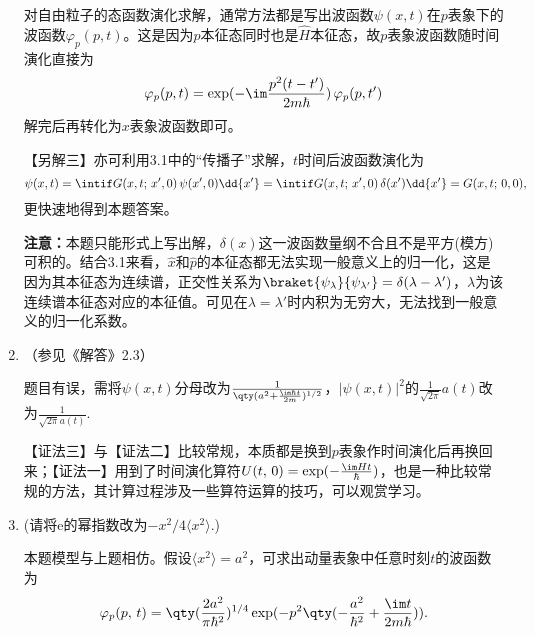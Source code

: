 \begin{enumerate}[label=\textbf{3.\arabic*}]


对自由粒子的态函数演化求解，通常方法都是写出波函数$\psi(x,t)$在$p$表象下的波函数$\varphi_p(p,t)$。这是因为$\hat{p}$本征态同时也是$\hat{H}$本征态，故$p$表象波函数随时间演化直接为
\[\varphi_p(p,t) = \exp(-\im\frac{p^2(t-t')}{2m\hbar})\,\varphi_p(p,t')\]
解完后再转化为$x$表象波函数即可。

【另解三】亦可利用3.1中的“传播子”求解，$t$时间后波函数演化为
\[\psi(x,t) = \intif G(x,t;\,x',0)\,\psi(x',0) \dd{x'} = \intif G(x,t;\,x',0)\,\delta(x') \dd{x'} = G(x,t;\,0,0), \]
更快速地得到本题答案。

\textbf{注意：}本题只能形式上写出解，$\delta(x)$这一波函数量纲不合且不是平方(模方)可积的。结合3.1来看，$\hat{x}$和$\hat{p}$的本征态都无法实现一般意义上的归一化，这是因为其本征态为连续谱，正交性关系为$\braket{\psi_{\lambda}}{\psi_{\lambda'}}=\delta(\lambda-\lambda')$，$\lambda$为该连续谱本征态对应的本征值。可见在$\lambda=\lambda'$时内积为无穷大，无法找到一般意义的归一化系数。

\item （参见《解答》2.3）

题目有误，需将$\psi(x,t)$分母改为$\frac{1}{\qty(a^2+\frac{\im\hbar t}{2m})^{1/2}}$，$|\psi(x,t)|^2$的$\frac{1}{\sqrt{2\pi}}a(t)$改为$\frac{1}{\sqrt{2\pi }a(t)}$.

【证法三】与【证法二】比较常规，本质都是换到$p$表象作时间演化后再换回来；【证法一】用到了时间演化算符$U(t,\,0)=\exp(-\frac{\im Ht}{\hbar})$，也是一种比较常规的方法，其计算过程涉及一些算符运算的技巧，可以观赏学习。

\item (请将e的幂指数改为$-x^2/4\langle x^2\rangle$.)

本题模型与上题相仿。假设$\langle x^2 \rangle = a^2$，可求出动量表象中任意时刻$t$的波函数为
\[\varphi_p(p,\,t) = \qty(\frac{2a^2}{\pi\hbar^2})^{1/4} \exp(-p^2\qty(-\frac{a^2}{\hbar^2}+\frac{\im t}{2m\hbar})).\]


\end{enumerate}
